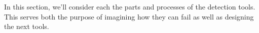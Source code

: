 In this section, we'll consider each the parts and processes of the detection tools.
This serves both the purpose of imagining how they can fail as well as designing the next tools.

